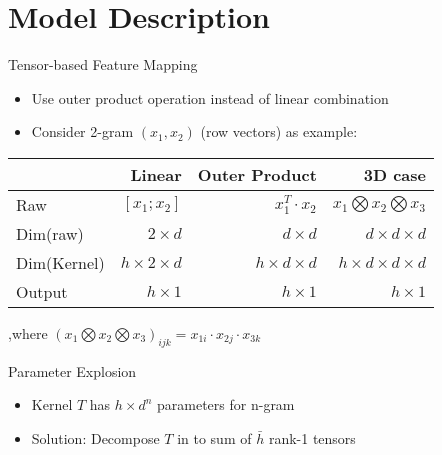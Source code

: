 \documentclass[compress]{beamer}
\begin{document}
\section{Model Description}
        \begin{frame}[allowframebreaks]{\secname}
            \begin{block}{Tensor-based Feature Mapping}
                \begin{itemize}
                    \item Use outer product operation instead of linear combination
                    \item Consider 2-gram $(x_1, x_2)$ (row vectors) as example:
                \end{itemize}
                \begin{table}[t]
                    \centering
                    \begin{tabular}{lrrr}
                                & Linear             & Outer Product        & 3D case                             \\ \hline
                    Raw         & $[x_1; x_2]$       & $x_1^T \cdot x_2$    & $x_1 \bigotimes x_2 \bigotimes x_3$ \\ \hline
                    Dim(raw)    & $2\times d$        & $d\times d$          & $d\times d \times d$                \\ \hline
                    Dim(Kernel) & $h\times2\times d$ & $h\times d \times d$ & $h\times d \times d \times d$       \\ \hline
                    Output      & $h\times 1$        & $h \times 1$         & $h \times 1$
                    \end{tabular}
                \end{table}
                ,where $(x_1 \bigotimes x_2 \bigotimes x_3)_{ijk} = x_{1i} \cdot x_{2j} \cdot x_{3k}$
            \end{block}
        \framebreak
            \begin{block}{Parameter Explosion}
                \begin{itemize}
                    \item Kernel $T$ has $h\times d^n$ parameters for n-gram
                    \item Solution: Decompose $T$ in to sum of $\bar{h}$ rank-1 tensors
                    \begin{table}[t]
                    \centering
                    \begin{tabular}{lll}

\end{tabular}
\end{table}
\end{itemize}
\end{block}
\end{frame}
\end{document}
